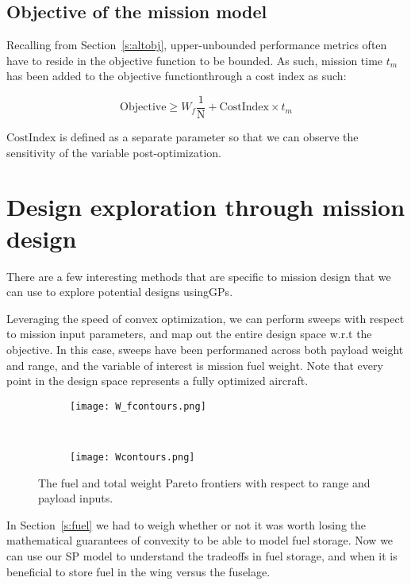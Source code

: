 \subsection{Objective of the mission model}

Recalling from Section~\ref{s:altobj}, upper-unbounded performance metrics often have to
reside in the objective function to be bounded. As such, mission time $t_m$ has been added
to the objective functionthrough a cost index as such:

\begin{equation}
    \mathrm{Objective} \geq W_f \frac{1}{\mathrm{N}} + \mathrm{Cost Index} \times t_m
    \label{e:missionobj}
\end{equation}

$\mathrm{Cost Index}$ is defined as a separate parameter so that we can observe the sensitivity
of the variable post-optimization.

\section{Design exploration through mission design}

There are a few interesting methods that are specific to mission design that we can use to explore
potential designs using\gls{GP}s.

Leveraging the speed of convex optimization, we can perform sweeps with respect to mission input
parameters, and map out the entire design space w.r.t the objective. In this case, sweeps have been
performaned across both payload weight and range, and the variable of interest is mission fuel weight.
Note that
every point in the design space represents a fully optimized aircraft.

\begin{figure*}[t!]
    \centering
    \begin{subfigure}[t]{0.5\linewidth}
        \centering
        \texttt{[image: W\_fcontours.png]}
    \end{subfigure}%
    ~
    \begin{subfigure}[t]{0.5\linewidth}
        \centering
        \texttt{[image: Wcontours.png]}
    \end{subfigure}
    \caption{The fuel and total weight Pareto frontiers with respect to range and payload inputs.}
    \label{f:pareto}
\end{figure*}

In Section~\ref{s:fuel} we had to weigh whether or not it was worth losing the mathematical
guarantees of convexity to be able to model fuel storage. Now we can use our \gls{SP} model to understand
the tradeoffs in fuel storage, and when it is beneficial to store fuel in the wing versus the fuselage.

